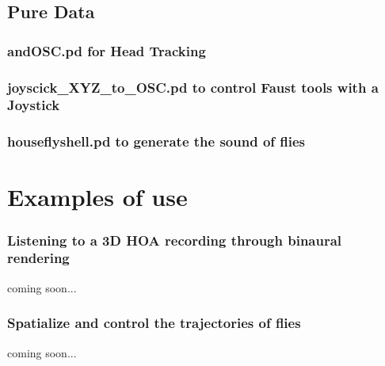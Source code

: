 \documentclass[10pt,a4paper]{article}
\begin{document}
\subsection{Pure Data}
\subsubsection{andOSC.pd for Head Tracking}
\label{sec:andOSC}
\subsubsection{joyscick\_XYZ\_to\_OSC.pd to control Faust tools with a Joystick}
\subsubsection{houseflyshell.pd to generate the sound of flies}

\section{Examples of use}
\subsubsection{Listening to a 3D HOA recording through binaural rendering}
coming soon...
\subsubsection{Spatialize and control the trajectories of flies}
coming soon...


\end{document}
